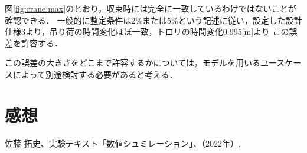\documentclass[dvipdfmx,titlepage,a4j]{jsarticle}  %
\begin{document}
図\ref{fig:crane:max}のとおり，収束時には完全に一致しているわけではないことが確認できる．
一般的に整定条件は2\%または5\%という記述に従い，設定した設計仕様3より，吊り荷の時間変化ほぼ一致，トロリの時間変化0.995[m]より
この誤差を許容する．

この誤差の大きさをどこまで許容するかについては，モデルを用いるユースケースによって別途検討する必要があると考える．

\section{感想}

\begin{thebibliography}{99}
   佐藤 拓史、実験テキスト「数値シュミレーション」、（2022年）,
\end{thebibliography}
\end{document}
